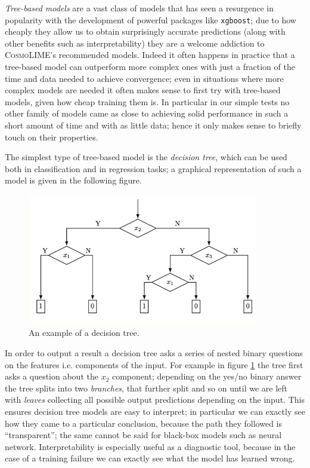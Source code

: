 \emph{Tree-based models} are a vast class of models that has seen a resurgence in popularity with the development of powerful packages like \texttt{xgboost}; due to how cheaply they allow us to obtain surprisingly accurate predictions (along with other benefits such as interpretability) they are a welcome addiction to \textsc{CosmoLIME}'s recommended models. Indeed it often happens in practice that a tree-based model can outperform more complex ones with just a fraction of the time and data needed to achieve convergence; even in situations where more complex models are needed it often makes sense to first try with tree-based models, given how cheap training them is.
In particular in our simple tests no other family of models came as close to achieving solid performance in such a short amount of time and with as little data; hence it only makes sense to briefly touch on their properties.

The simplest type of tree-based model is the \emph{decision tree}, which can be used both in classification and in regression tasks; a graphical representation of such a model is given in the following figure.

\begin{figure}[H]
    \centering
    \includegraphics[width=0.9\textwidth]{img/decision_tree.png}
    \caption{An example of a decision tree.}
    \label{fig:decision_tree}
\end{figure}

In order to output a result a decision tree asks a series of nested binary questions on the features i.e. components of the input. For example in figure \ref{fig:decision_tree} the tree first asks a question about the $x_2$ component; depending on the yes/no binary answer the tree splits into two \emph{branches}, that further split and so on until we are left with \emph{leaves} collecting all possible output predictions depending on the input.
This ensures decision tree models are easy to interpret; in particular we can exactly see how they came to a particular conclusion, because the path they followed is ``transparent''; the same cannot be said for black-box models such as neural network. Interpretability is especially useful as a diagnostic tool, because in the case of a training failure we can exactly see what the model has learned wrong.

